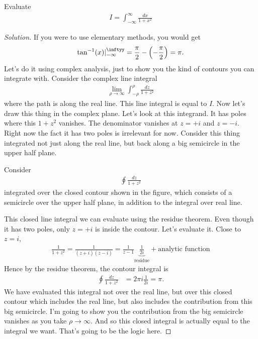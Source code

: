 \begin{example}
    Evaluate
    \begin{align}
        I = \int_{-\infty}^{\infty}
        \frac{dx}{1 + x^2}
    \end{align}
\end{example}
\begin{proof}[Solution]
    If you were to use elementary methods,
    you would get
    \begin{align}
        \tan^{-1}(x)|_{-\infty}^{\inftyy}
        = \frac{\pi}{2}
        - \left( -\frac{\pi}{2} \right)
        = \pi.
    \end{align}
    Let's do it using complex analysis,
    just to show you the kind of contours you can integrate with.
    Consider the complex line integral
    \begin{align}
        \lim_{\rho\to\infty}
        \int_{-\rho}^{\rho}
        \frac{dz}{1 + z^2}
    \end{align}
    where the path is along the real line.
    This line integral is equal to $I$.
    Now let's draw this thing in the complex plane.
    Let's look at this integrand.
    It has poles where this $1+z^2$ vanishes.
    The denominator vanishes at $z=+i$ and $z=-i$.
    Right now the fact it has two poles is irrelevant for now.
    Consider this thing integrated not just along the real line,
    but back along a big semicircle in the upper half plane.

    Consider
    \begin{align}
        \oint \frac{dz}{1 + z^2}
    \end{align}
    integrated over the closed contour shown in the figure,
    which consists of a semicircle over the upper half plane,
    in addition to the integral over real line.

    This closed line integral we can evaluate using the residue theorem.
    Even though it has two poles,
    only $z=+i$ is inside the contour.
    Let's evaluate it.
    Close to $z=i$,
    \begin{align}
        \frac{1}{1 + z^2} = \frac{1}{(z + i)(z - i)}
        = \frac{1}{z - 1} \underbrace{\frac{1}{2i}}_{\text{residue}}
        + \text{analytic function}
    \end{align}
    Hence by the residue theorem, the contour integral is
    \begin{align}
        \oint \frac{dz}{1 + z^2} &=
        2\pi i \frac{1}{2i} = \pi.
    \end{align}
    We have evaluated this integral not over the real line,
    but over this closed contour which includes the real line,
    but also includes the contribution from this big semicircle.
    I'm going to show you the contribution from the big semicircle vanishes as
    you take $\rho\to\infty$.
    And so this closed integral is actually equal to the integral we want.
    That's going to be the logic here.


\end{proof}

